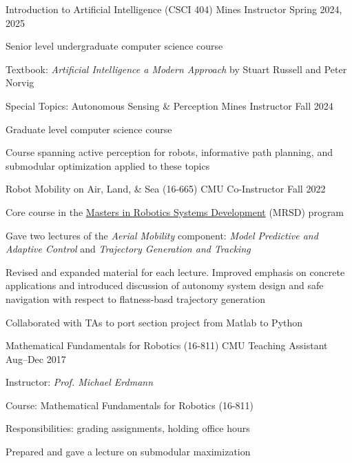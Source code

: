 
\begin{cventries}
  \cventry
  {Introduction to Artificial Intelligence (CSCI 404)}
  {Mines}
  {Instructor}
  {Spring 2024, 2025}
  {
    \begin{cvitems}
      \item Senior level undergraduate computer science course
      \item Textbook: \emph{Artificial Intelligence a Modern Approach} by
        Stuart Russell and Peter Norvig
    \end{cvitems}
  }
  \cventry
  {Special Topics: Autonomous Sensing \& Perception}
  {Mines}
  {Instructor}
  {Fall 2024}
  {
    \begin{cvitems}
      \item Graduate level computer science course
      \item Course spanning active perception for robots, informative path
        planning, and submodular optimization applied to these topics
    \end{cvitems}
  }
  \cventry
  {Robot Mobility on Air, Land, \& Sea (16-665)}
  {CMU}
  {Co-Instructor}
  {Fall 2022}
  {
    \begin{cvitems}
      \item Core course in the \href{https://mrsd.ri.cmu.edu/}{Masters in
        Robotics Systems Development} (MRSD) program
      \item Gave two lectures of the \emph{Aerial Mobility} component:
        \emph{Model Predictive and Adaptive Control}
        and
        \emph{Trajectory Generation and Tracking}
      \item Revised and expanded material for each lecture.
        Improved emphasis on concrete applications and introduced discussion of
        autonomy system design and safe navigation with respect to flatness-basd
        trajectory generation
      \item Collaborated with TAs to port section project from Matlab to Python
    \end{cvitems}
  }
  \cventry
  {Mathematical Fundamentals for Robotics (16-811)}
  {CMU}
  {Teaching Assistant}
  {Aug--Dec 2017}
  {
    Instructor: \emph{Prof. Michael Erdmann}\linebreak
    \begin{cvitems} %
    \item Course: Mathematical Fundamentals for Robotics (16-811)
    \item Responsibilities: grading assignments, holding office hours
    \item Prepared and gave a lecture on submodular maximization
    \end{cvitems}
  }
\end{cventries}

